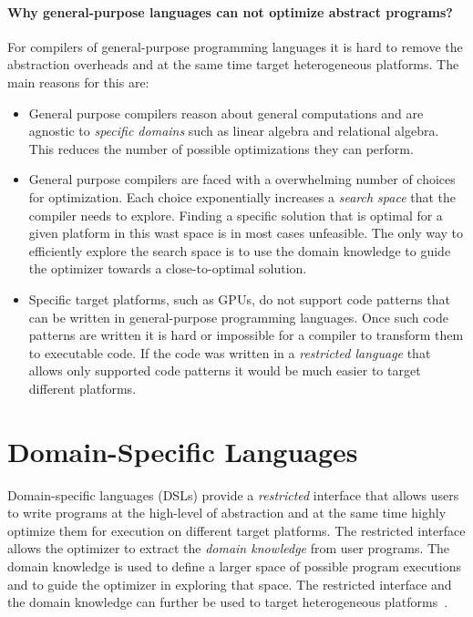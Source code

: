 \paragraph{Why general-purpose languages can not optimize abstract programs?} For compilers of
 general-purpose programming languages it is hard to remove the abstraction overheads
 and at the same time target heterogeneous platforms. The main reasons for this are:\begin{itemize}

 \item General purpose compilers reason about general computations and are agnostic to
  \emph{specific domains} such as linear algebra and relational algebra. This reduces
   the number of possible optimizations they can perform.

 \item General purpose compilers are faced with a overwhelming number of choices
   for optimization. Each choice exponentially increases a \emph{search space}
   that the compiler needs to explore. Finding a specific solution that is optimal
   for a given platform in this wast space is in most cases unfeasible. The only way
   to efficiently explore the search space is to use the domain knowledge to guide
   the optimizer towards a close-to-optimal solution.

  \item Specific target platforms, such as GPUs, do not support code patterns
  that can be written in general-purpose programming languages. Once such code patterns are
  written it is hard or impossible for a compiler to transform them to executable code.
  If the code was written in a \emph{restricted language} that allows only supported code patterns
  it would be much easier to target different platforms.

 \end{itemize}

\section{Domain-Specific Languages}
\label{sec:domain-specific-languages}

Domain-specific languages (DSLs) provide a \emph{restricted} interface that allows
 users to write programs at the high-level of abstraction and at the
 same time highly optimize them for execution on different target platforms. The restricted
 interface allows the optimizer to extract the \emph{domain knowledge} from user programs.
 The domain knowledge is used to define a larger space of possible program executions
 and to guide the optimizer in exploring that space. The restricted interface and the domain knowledge
 can further be used to target heterogeneous platforms~\cite{chafi_language_2010}.

